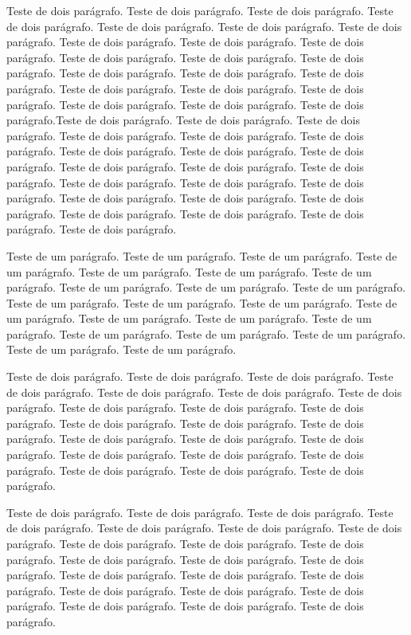 \documentclass[12pt]{article}
\begin{document}
Teste de dois parágrafo. Teste de dois parágrafo. Teste de dois parágrafo. Teste de dois parágrafo. Teste de dois parágrafo. Teste de dois parágrafo. Teste de dois parágrafo. Teste de dois parágrafo. Teste de dois parágrafo. Teste de dois parágrafo. Teste de dois parágrafo. Teste de dois parágrafo. Teste de dois parágrafo. Teste de dois parágrafo. Teste de dois parágrafo. Teste de dois parágrafo. Teste de dois parágrafo. Teste de dois parágrafo. Teste de dois parágrafo. Teste de dois parágrafo. Teste de dois parágrafo. Teste de dois parágrafo.Teste de dois parágrafo. Teste de dois parágrafo. Teste de dois parágrafo. Teste de dois parágrafo. Teste de dois parágrafo. Teste de dois parágrafo. Teste de dois parágrafo. Teste de dois parágrafo. Teste de dois parágrafo. Teste de dois parágrafo. Teste de dois parágrafo. Teste de dois parágrafo. Teste de dois parágrafo. Teste de dois parágrafo. Teste de dois parágrafo. Teste de dois parágrafo. Teste de dois parágrafo. Teste de dois parágrafo. Teste de dois parágrafo. Teste de dois parágrafo. Teste de dois parágrafo. Teste de dois parágrafo.

Teste de um parágrafo. Teste de um parágrafo. Teste de um parágrafo. Teste de um parágrafo. Teste de um parágrafo. Teste de um parágrafo. Teste de um parágrafo. Teste de um parágrafo. Teste de um parágrafo. Teste de um parágrafo. Teste de um parágrafo. Teste de um parágrafo. Teste de um parágrafo. Teste de um parágrafo. Teste de um parágrafo. Teste de um parágrafo. Teste de um parágrafo. Teste de um parágrafo. Teste de um parágrafo. Teste de um parágrafo. Teste de um parágrafo. Teste de um parágrafo.

Teste de dois parágrafo. Teste de dois parágrafo. Teste de dois parágrafo. Teste de dois parágrafo. Teste de dois parágrafo. Teste de dois parágrafo. Teste de dois parágrafo. Teste de dois parágrafo. Teste de dois parágrafo. Teste de dois parágrafo. Teste de dois parágrafo. Teste de dois parágrafo. Teste de dois parágrafo. Teste de dois parágrafo. Teste de dois parágrafo. Teste de dois parágrafo. Teste de dois parágrafo. Teste de dois parágrafo. Teste de dois parágrafo. Teste de dois parágrafo. Teste de dois parágrafo. Teste de dois parágrafo.

Teste de dois parágrafo. Teste de dois parágrafo. Teste de dois parágrafo. Teste de dois parágrafo. Teste de dois parágrafo. Teste de dois parágrafo. Teste de dois parágrafo. Teste de dois parágrafo. Teste de dois parágrafo. Teste de dois parágrafo. Teste de dois parágrafo. Teste de dois parágrafo. Teste de dois parágrafo. Teste de dois parágrafo. Teste de dois parágrafo. Teste de dois parágrafo. Teste de dois parágrafo. Teste de dois parágrafo. Teste de dois parágrafo. Teste de dois parágrafo. Teste de dois parágrafo. Teste de dois parágrafo.
\end{document}
